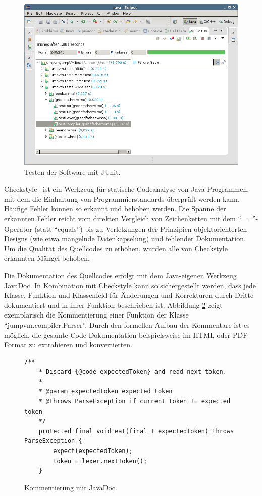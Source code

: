 \documentclass[german, a4paper, parskip, bibliography=totoc]{scrartcl}
\begin{document}
\begin{figure}[htb]
    \centering
    \includegraphics[width=\textwidth]{screenshot_junit.png}
    \caption{Testen der Software mit JUnit.}
    \label{img_jumpvm_junit}
\end{figure}

Checkstyle~\cite{url_checkstyle} ist ein Werkzeug für statische Codeanalyse von
Java-Programmen, mit dem die Einhaltung von Programmierstandards überprüft
werden kann. Häufige Fehler können so erkannt und behoben werden. Die Spanne
der erkannten Fehler reicht vom direkten Vergleich von Zeichenketten mit dem
\enquote{==}-Operator (statt \enquote{equals}) bis zu Verletzungen der
Prinzipien objektorienterten Designs (wie etwa mangelnde Datenkapselung) und
fehlender Dokumentation. Um die Qualität des Quellcodes zu erhöhen, wurden alle
von Checkstyle erkannten Mängel behoben.

Die Dokumentation des Quellcodes erfolgt mit dem Java-eigenen Werkzeug
JavaDoc. In Kombination mit Checkstyle kann so sichergestellt werden, dass jede
Klasse, Funktion und Klassenfeld für Änderungen und Korrekturen durch Dritte
dokumentiert und in ihrer Funktion beschrieben ist. Abbildung
\ref{code_javadoc} zeigt exemplarisch die Kommentierung einer Funktion der
Klasse \enquote{jumpvm.compiler.Parser}. Durch den formellen Aufbau der
Kommentare ist es möglich, die gesamte Code-Dokumentation beispielsweise im
HTML oder PDF-Format zu extrahieren und konvertierten.

\begin{figure}[htb]
    \begin{lstlisting}[gobble=4]
    /**
    * Discard {@code expectedToken} and read next token.
    *
    * @param expectedToken expected token
    * @throws ParseException if current token != expected token
    */
    protected final void eat(final T expectedToken) throws ParseException {
        expect(expectedToken);
        token = lexer.nextToken();
    }
    \end{lstlisting}
    \caption{Kommentierung mit JavaDoc.}
    \label{code_javadoc}
\end{figure}
\end{document}
